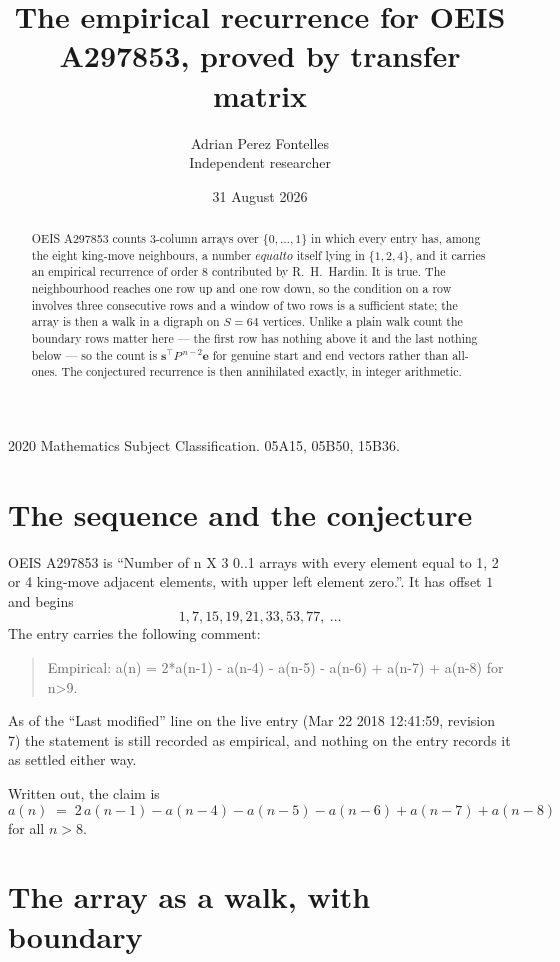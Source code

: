 \documentclass[11pt,a4paper]{article}
\title{The empirical recurrence for OEIS A297853, proved by transfer matrix}
\author{Adrian Perez Fontelles\\ \small Independent researcher}
\date{31 August 2026}
\theoremstyle{plain}
\theoremstyle{definition}
\begin{document}
\maketitle

\begin{abstract}
OEIS A297853 counts $3$-column arrays over $\{0,\dots,1\}$ in which every entry has,
among the eight king-move neighbours, a number $equal to$ itself lying in $\{1,2,4\}$, and it carries an empirical
recurrence of order $8$ contributed by R.~H.~Hardin. It is true. The neighbourhood
reaches one row up and one row down, so the condition on a row involves three consecutive
rows and a window of two rows is a sufficient state; the array is then a walk in a digraph
on $S=64$ vertices. Unlike a plain walk count the boundary rows matter here --- the first
row has nothing above it and the last nothing below --- so the count is
$\mathbf{s}^{\!\top}P^{\,n-2}\mathbf{e}$ for genuine start and end vectors rather than
all-ones. The conjectured recurrence is then annihilated exactly, in integer arithmetic.
\end{abstract}

\noindent\small 2020 Mathematics Subject Classification. 05A15, 05B50, 15B36.\normalsize

\section{The sequence and the conjecture}

OEIS A297853 is ``Number of n X 3 0..1 arrays with every element equal to 1, 2 or 4 king-move adjacent elements, with upper left element zero.''. It has offset
$1$ and begins
\[
1, 7, 15, 19, 21, 33, 53, 77,\ \dots
\]
The entry carries the following comment:
\begin{quote}\small
Empirical: a(n) = 2*a(n-1) - a(n-4) - a(n-5) - a(n-6) + a(n-7) + a(n-8) for n>9.
\end{quote}
As of the ``Last modified'' line on the live entry (Mar 22 2018 12:41:59, revision
7) the statement is still recorded as empirical, and nothing on the entry
records it as settled either way.

Written out, the claim is
\begin{equation}\label{eq:conj}
a(n)\;=\;2\,a(n-1) - a(n-4) - a(n-5) - a(n-6) + a(n-7) + a(n-8)
\end{equation}
for all $n>8$.

\section{The array as a walk, with boundary}
\end{document}

